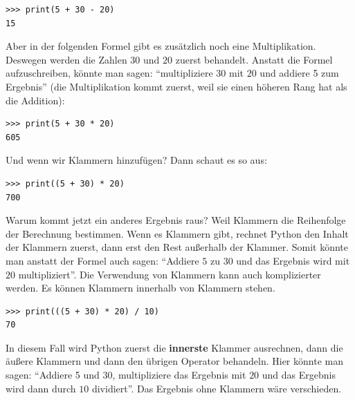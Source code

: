 \begin{Verbatim}[frame=single]
>>> print(5 + 30 - 20)
15
\end{Verbatim}

\noindent
Aber in der folgenden Formel gibt es zusätzlich noch eine Multiplikation. Deswegen werden die Zahlen $30$ und $20$ zuerst behandelt. Anstatt die Formel aufzuschreiben, könnte man sagen: ``multipliziere $30$ mit $20$ und addiere 5 zum Ergebnis'' (die Multiplikation kommt zuerst, weil sie einen höheren Rang hat als die Addition):

\begin{Verbatim}[frame=single]
>>> print(5 + 30 * 20)
605
\end{Verbatim}

\noindent
Und wenn wir Klammern hinzufügen? Dann schaut es so aus:

\begin{Verbatim}[frame=single]
>>> print((5 + 30) * 20)
700
\end{Verbatim}

\noindent
Warum kommt jetzt ein anderes Ergebnis raus? Weil Klammern die Reihenfolge der Berechnung bestimmen. Wenn es Klammern gibt, rechnet Python den Inhalt der Klammern zuerst, dann erst den Rest außerhalb der Klammer. Somit könnte man anstatt der Formel auch sagen: ``Addiere $5$ zu $30$ und das Ergebnis wird mit $20$ multipliziert''.
Die Verwendung von Klammern kann auch komplizierter werden. Es können Klammern innerhalb von Klammern stehen.

\begin{Verbatim}[frame=single]
>>> print(((5 + 30) * 20) / 10)
70
\end{Verbatim}

\noindent
In diesem Fall wird Python zuerst die \textbf{innerste} Klammer ausrechnen, dann die äußere Klammern und dann den übrigen Operator behandeln. Hier könnte man sagen: ``Addiere 5 und $30$, multipliziere das Ergebnis mit $20$ und das Ergebnis wird dann durch $10$ dividiert''. Das Ergebnis ohne Klammern wäre verschieden.

